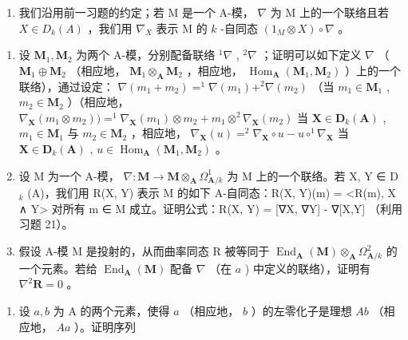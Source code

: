 \begin{enumerate}
\def\labelenumi{\arabic{enumi})}
\setcounter{enumi}{21}
\tightlist
\item
  我们沿用前一习题的约定；若 M 是一个 A-模， \(\nabla\) 为 M 上的一个联络且若 \(X \in D_k(A)\) ，我们用 \(\nabla_X\) 表示 M 的 \(k\) -自同态 \((1_M \otimes X) \circ \nabla\) 。
\end{enumerate}

\begin{enumerate}
\def\labelenumi{\alph{enumi})}
\item
  设 \(\mathbf{M}_1, \mathbf{M}_2\) 为两个 A-模，分别配备联络 \(^1\nabla\) , \(^2\nabla\) ；证明可以如下定义 \(\nabla\) （ \(\mathbf{M}_1 \oplus \mathbf{M}_2\) （相应地， \(\mathbf{M}_1 \otimes_{\mathbf{A}} \mathbf{M}_2\) ，相应地， \(\operatorname{Hom}_{\mathbf{A}}(\mathbf{M}_1, \mathbf{M}_2)\) ）上的一个联络），通过设定： \(\nabla(m_1 + m_2) = ^1\nabla(m_1) + ^2\nabla(m_2)\) （当 \(m_1 \in \mathbf{M}_1\) , \(m_2 \in \mathbf{M}_2\) ）（相应地， \(\nabla_{\mathbf{X}}(m_1 \otimes m_2)) = ^1\nabla_{\mathbf{X}}(m_1) \otimes m_2 + m_1 \otimes ^2\nabla_{\mathbf{X}}(m_2)\) 当 \(\mathbf{X} \in \mathbf{D}_k(\mathbf{A})\) , \(m_1 \in \mathbf{M}_1\) 与 \(m_2 \in \mathbf{M}_2\) ，相应地， \(\nabla_{\mathbf{X}}(u) = ^2\nabla_{\mathbf{X}} \circ u - u \circ ^1\nabla_{\mathbf{X}}\) 当 \(\mathbf{X} \in \mathbf{D}_k(\mathbf{A})\) , \(u \in \operatorname{Hom}_{\mathbf{A}}(\mathbf{M}_1, \mathbf{M}_2)\) 。
\item
  设 M 为一个 A-模， \(\nabla: \mathbf{M} \to \mathbf{M} \otimes_{\mathbf{A}} \Omega_{\mathbf{A}/k}^{1}\) 为 M 上的一个联络。若 X, Y ∈ D \(_{k}\) (A)，我们用 R(X, Y) 表示 M 的如下 A-自同态：R(X, Y)(m) = \textless R(m), X ∧ Y\textgreater{} 对所有 m ∈ M 成立。证明公式：R(X, Y) = {[}∇X, ∇Y{]} - ∇{[}X,Y{]} （利用习题 21）。
\item
  假设 A-模 M 是投射的，从而曲率同态 R 被等同于 \(\operatorname{End}_{\mathbf{A}}(\mathbf{M}) \otimes_{\mathbf{A}} \Omega_{\mathbf{A}/k}^{2}\) 的一个元素。若给 \(\operatorname{End}_{\mathbf{A}}(\mathbf{M})\) 配备 \(\nabla\) （在 \(a\) ) 中定义的联络），证明有 \(\nabla^{2}\mathbf{R} = 0\) 。
\end{enumerate}


\begin{enumerate}
\def\labelenumi{\arabic{enumi})}
\tightlist
\item
  设 \(a, b\) 为 A 的两个元素，使得 \(a\) （相应地， \(b\) ）的左零化子是理想 \(Ab\) （相应地， \(Aa\) ）。证明序列
\end{enumerate}


